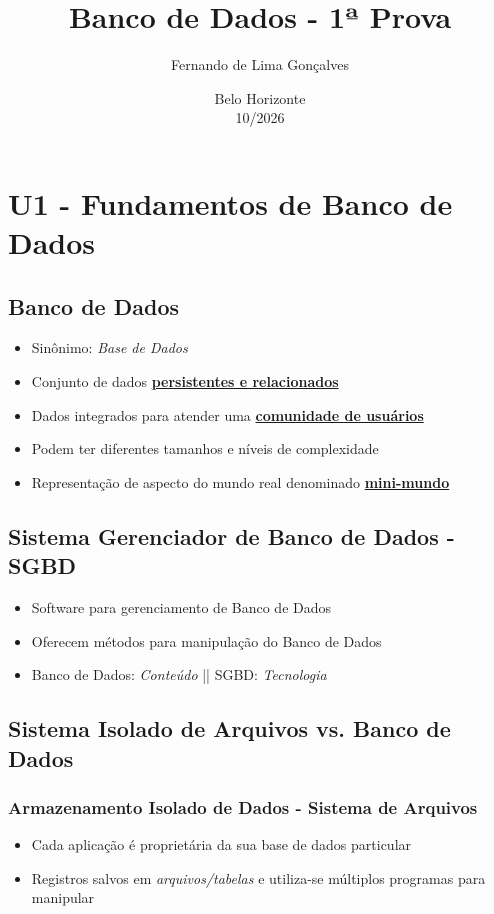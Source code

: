 \documentclass[12pt,a4paper,titlepage]{article}
\title{Banco de Dados - 1ª Prova}
\author{Fernando de Lima Gonçalves}
\date{Belo Horizonte\\10/2026}
\begin{document}
\maketitle
\tableofcontents

\section{U1 - Fundamentos de Banco de Dados}
\subsection{Banco de Dados}
\begin{itemize}
    \item Sinônimo: \textit{Base de Dados}
    \item Conjunto de dados \textbf{\underline{persistentes e relacionados}}
    \item Dados integrados para atender uma \textbf{\underline{comunidade de usuários}}
    \item Podem ter diferentes tamanhos e níveis de complexidade
    \item Representação de aspecto do mundo real denominado \textbf{\underline{mini-mundo}}
\end{itemize}

\subsection{Sistema Gerenciador de Banco de Dados - SGBD}
\begin{itemize}
    \item Software para gerenciamento de Banco de Dados
    \item Oferecem métodos para manipulação do Banco de Dados
    \item Banco de Dados: \textit{Conteúdo} || SGBD: \textit{Tecnologia}
\end{itemize}

\subsection{Sistema Isolado de Arquivos vs. Banco de Dados}
\subsubsection{Armazenamento Isolado de Dados - Sistema de Arquivos}
\begin{itemize}
    \item Cada aplicação é proprietária da sua base de dados particular
    \item Registros salvos em \textit{arquivos/tabelas} e utiliza-se múltiplos programas para manipular
\end{itemize}
\end{document}
